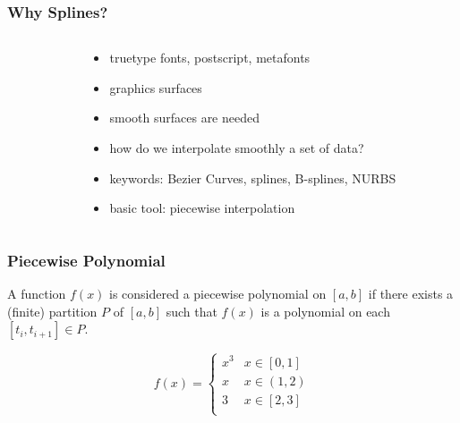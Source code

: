 \documentclass[10pt]{beamer}
\begin{document}
\begin{frame}
\frametitle{Why Splines?}
\begin{columns}
\begin{column}{0.45\textwidth}
\begin{center}
\end{center}
\begin{center}
\end{center}
\begin{center}
\end{center}
\end{column}
\begin{column}{0.45\textwidth}
\begin{itemize}
  \item truetype fonts, postscript, metafonts
  \item graphics surfaces
  \item smooth surfaces are needed
  \item how do we interpolate smoothly a set of data?
  \item keywords: Bezier Curves, splines, B-splines, NURBS
  \item basic tool: piecewise interpolation
\end{itemize}
\end{column}
\end{columns}
\end{frame}
\begin{frame}
\frametitle{Piecewise Polynomial}
A function $f(x)$ is considered a piecewise polynomial on $[a,b]$ if
there exists a (finite) partition $P$ of $[a,b]$ such that $f(x)$ is a
polynomial on each $[t_i,t_{i+1}]\in P$.

\begin{example}
\begin{equation*}
  f(x) = \begin{cases}
x^3 & x \in [0,1]\\
x & x \in (1,2)\\
3 & x \in [2,3]\\
\end{cases}
\end{equation*}
\end{example}
\begin{center}
\end{center}
\end{frame}
\end{document}
